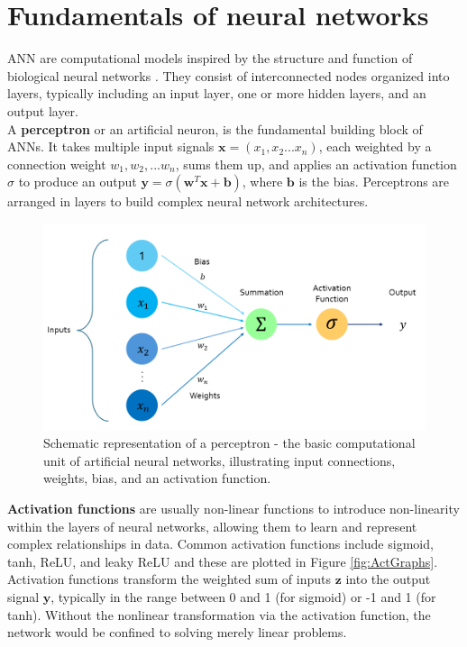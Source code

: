 \section{Fundamentals of neural networks}
\gls{ANN} are computational models inspired by the structure and function of biological neural networks \cite{rumel}. They consist of interconnected nodes organized into layers, typically including an input layer, one or more hidden layers, and an output layer. \\ 
A \textbf{perceptron} or an artificial neuron, is the fundamental building block of ANNs. It takes multiple input signals $\mathbf{x}= \left(x_1, x_2 ...x_n\right)$, each weighted by a connection weight $w_1,w_2,...w_n$, sums them up, and applies an activation function $\sigma$ to produce an output $\mathbf{y} = \sigma \left(\mathbf{w}^T\mathbf{x} + \mathbf{b} \right)$, where $\mathbf{b}$ is the bias. Perceptrons are arranged in layers to build complex neural network architectures.\\
\begin{figure}[ht]
    \centering
    \includegraphics[width=12cm]{images/Theory-DL/ActFn.png}
    \caption{Schematic representation of a perceptron - the basic computational unit of artificial neural networks, illustrating input connections, weights, bias, and an activation function.}
    \label{fig:Perceptron}
  \end{figure}
\textbf{Activation functions} are usually non-linear functions to introduce non-linearity within the layers of neural networks, allowing them to learn and represent complex relationships in data. Common activation functions include sigmoid, tanh, \gls{ReLU}, and leaky ReLU and these are plotted in Figure \ref{fig:ActGraphs}. Activation functions transform the weighted sum of inputs $\mathbf{z}$ into the output signal $\mathbf{y}$, typically in the range between 0 and 1 (for sigmoid) or -1 and 1 (for tanh). Without the nonlinear transformation via the activation function, the network would be confined to solving merely linear problems. \\
